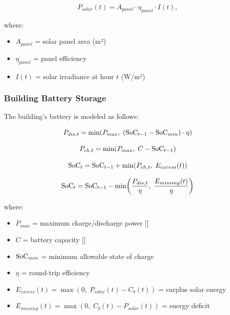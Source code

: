 \begin{equation}
P_{solar}(t) = A_{panel} \cdot \eta_{panel} \cdot I(t),
\end{equation}

where:
\begin{itemize}
    \item $A_{panel}$ = solar panel area (m²)
    \item $\eta_{panel}$ = panel efficiency
    \item $I(t)$ = solar irradiance at hour $t$ (W/m²)
\end{itemize}

\subsubsection{Building Battery Storage}

The building's battery is modeled as follows:

\begin{equation}
P_{dis,t} = \min\!\left( P_{max}, \; (\text{SoC}_{t-1} - \text{SoC}_{min}) \cdot \eta \right)
\label{eq:battery_discharge_power}
\end{equation}


\begin{equation}
P_{ch,t} = \min\!\left( P_{max}, \; C - \text{SoC}_{t-1} \right)
\label{eq:battery_charge_power}
\end{equation}


\begin{equation}
\text{SoC}_t = \text{SoC}_{t-1} + \min\!\left( P_{ch,t}, \; E_{excess}(t) \right)
\label{eq:soc_charge}
\end{equation}

\begin{equation}
\text{SoC}_t = \text{SoC}_{t-1} - \min\!\left( \frac{P_{dis,t}}{\eta}, \; \frac{E_{missing}(t)}{\eta} \right)
\label{eq:soc_discharge}
\end{equation}

where:
\begin{itemize}
    \item $P_{max}$ = maximum charge/discharge power [\kw]
    \item $C$ = battery capacity [\kwh]
    \item $\text{SoC}_{min}$ = minimum allowable state of charge
    \item $\eta$ = round-trip efficiency
    \item $E_{excess}(t) = \max(0, \; P_{solar}(t) - C_b(t))$ = surplus solar energy
    \item $E_{missing}(t) = \max(0, \; C_b(t) - P_{solar}(t))$ = energy deficit
\end{itemize}

